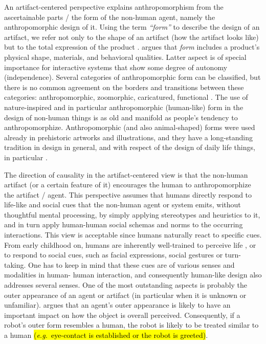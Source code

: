 \documentclass{frontiersSCNS} %
\newcommand{\eg}{{\textit{e.g.~}}}
\begin{document}
An artifact-centered perspective explains anthropomorphism from the ascertainable 
parts / the form of the non-human agent, namely the anthropomorphic design of it.
Using the term \textit{``form''} to describe the design of an artifact, we refer 
not only to the shape of an artifact (how the artifact looks like) but to the total 
expression of the product \citep{bartneck_shaping_2004}. \cite{disalvo_hug:_2003} 
argues that \textit{form} includes a product's physical shape, materials, and 
behavioral qualities. Latter aspect is of special importance for interactive 
systems that show some degree of autonomy (independence).
Several categories of anthropomorphic form can be classified, but there is no 
common agreement on the borders and transitions between these categories: 
anthropomorphic, zoomorphic, caricatured, functional \citep{fong_survey_2003}.
The use of nature-inspired and in particular anthropomorphic (human-like) form in the 
design of non-human things is as old and manifold as people's tendency to anthropomorphize. 
Anthropomorphic (and also animal-shaped) forms were used already in prehistoric 
artworks and illustrations, and they have a long-standing tradition in design in 
general, and with respect of the design of daily life things, in particular 
\citep{norman_design_1988,guthrie_bottles_2000}.

The direction of causality in the artifact-centered view is that the non-human artifact 
(or a certain feature of it) encourages the human to anthropomorphize the artifact / 
agent. This perspective assumes that humans directly respond to life-like and social 
cues that the non-human agent or system emits, without thoughtful mental processing, 
by simply applying stereotypes and heuristics to it, and in turn apply 
human-human social schemas and norms to the occurring interactions.
This view is acceptable since humans naturally react to specific 
cues. From early childhood 
on, humans are inherently well-trained to perceive life \citep{epley_seeing_2007}, 
or to respond to social cues, such as facial expressions, social gestures or turn-taking. 
One has to keep in mind that these cues are of various senses and modalities in human-
human interaction, and consequently human-like design also addresses several senses. 
One of the most outstanding aspects is probably the outer appearance of an agent or 
artifact (in particular when it is unknown or unfamiliar). \cite{schmitz_concepts_2011} 
argues that an agent's outer appearance is likely to have an important impact on how 
the object is overall perceived. Consequently, if a robot's outer form resembles a 
human, the robot is likely to be treated similar to a human \hl{(\eg eye-contact is 
established or the robot is greeted)}.
\end{document}
